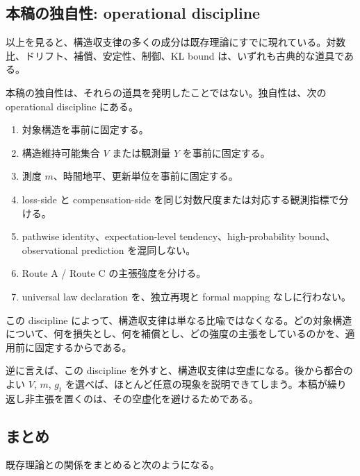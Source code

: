 \documentclass[12pt,a4paper]{article}
\begin{document}
\subsection{本稿の独自性: operational discipline}\label{ux672cux7a3fux306eux72ecux81eaux6027-operational-discipline}

以上を見ると、構造収支律の多くの成分は既存理論にすでに現れている。対数比、ドリフト、補償、安定性、制御、KL bound は、いずれも古典的な道具である。

本稿の独自性は、それらの道具を発明したことではない。独自性は、次の operational discipline にある。

\begin{enumerate}
\def\labelenumi{\arabic{enumi}.}
\tightlist
\item
  対象構造を事前に固定する。
\item
  構造維持可能集合 \(V\) または観測量 \(Y\) を事前に固定する。
\item
  測度 \(m\)、時間地平、更新単位を事前に固定する。
\item
  loss-side と compensation-side を同じ対数尺度または対応する観測指標で分ける。
\item
  pathwise identity、expectation-level tendency、high-probability bound、observational prediction を混同しない。
\item
  Route A / Route C の主張強度を分ける。
\item
  universal law declaration を、独立再現と formal mapping なしに行わない。
\end{enumerate}

この discipline によって、構造収支律は単なる比喩ではなくなる。どの対象構造について、何を損失とし、何を補償とし、どの強度の主張をしているのかを、適用前に固定するからである。

逆に言えば、この discipline を外すと、構造収支律は空虚になる。後から都合のよい \(V\), \(m\), \(g_{t}\) を選べば、ほとんど任意の現象を説明できてしまう。本稿が繰り返し非主張を置くのは、その空虚化を避けるためである。

\subsection{まとめ}\label{ux307eux3068ux3081}

既存理論との関係をまとめると次のようになる。
\end{document}
